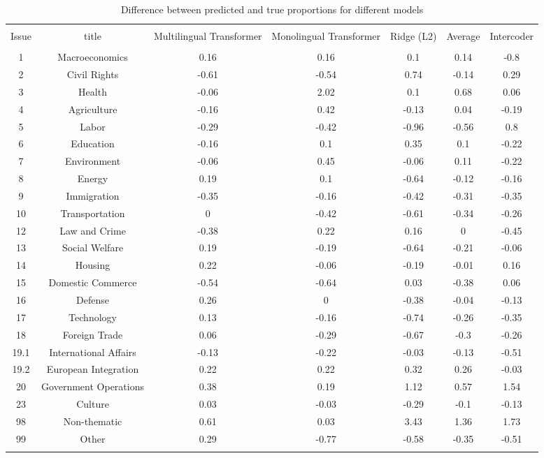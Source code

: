 
\begin{table}[!htbp] \centering 
  \caption{Difference between predicted and true proportions for different models} 
  \label{tab:aggregated-eval} 
\begin{tabular}{@{\extracolsep{5pt}} ccccccc} 
\\[-1.8ex]\hline 
\hline \\[-1.8ex] 
Issue & title & Multilingual Transformer & Monolingual Transformer & Ridge (L2) & Average & Intercoder \\ 
\hline \\[-1.8ex] 
1 & Macroeconomics & 0.16 & 0.16 & 0.1 & 0.14 & -0.8 \\ 
2 & Civil Rights & -0.61 & -0.54 & 0.74 & -0.14 & 0.29 \\ 
3 & Health & -0.06 & 2.02 & 0.1 & 0.68 & 0.06 \\ 
4 & Agriculture & -0.16 & 0.42 & -0.13 & 0.04 & -0.19 \\ 
5 & Labor & -0.29 & -0.42 & -0.96 & -0.56 & 0.8 \\ 
6 & Education & -0.16 & 0.1 & 0.35 & 0.1 & -0.22 \\ 
7 & Environment & -0.06 & 0.45 & -0.06 & 0.11 & -0.22 \\ 
8 & Energy & 0.19 & 0.1 & -0.64 & -0.12 & -0.16 \\ 
9 & Immigration & -0.35 & -0.16 & -0.42 & -0.31 & -0.35 \\ 
10 & Transportation & 0 & -0.42 & -0.61 & -0.34 & -0.26 \\ 
12 & Law and Crime & -0.38 & 0.22 & 0.16 & 0 & -0.45 \\ 
13 & Social Welfare & 0.19 & -0.19 & -0.64 & -0.21 & -0.06 \\ 
14 & Housing & 0.22 & -0.06 & -0.19 & -0.01 & 0.16 \\ 
15 & Domestic Commerce & -0.54 & -0.64 & 0.03 & -0.38 & 0.06 \\ 
16 & Defense & 0.26 & 0 & -0.38 & -0.04 & -0.13 \\ 
17 & Technology & 0.13 & -0.16 & -0.74 & -0.26 & -0.35 \\ 
18 & Foreign Trade & 0.06 & -0.29 & -0.67 & -0.3 & -0.26 \\ 
19.1 & International Affairs & -0.13 & -0.22 & -0.03 & -0.13 & -0.51 \\ 
19.2 & European Integration & 0.22 & 0.22 & 0.32 & 0.26 & -0.03 \\ 
20 & Government Operations & 0.38 & 0.19 & 1.12 & 0.57 & 1.54 \\ 
23 & Culture & 0.03 & -0.03 & -0.29 & -0.1 & -0.13 \\ 
98 & Non-thematic & 0.61 & 0.03 & 3.43 & 1.36 & 1.73 \\ 
99 & Other & 0.29 & -0.77 & -0.58 & -0.35 & -0.51 \\ 
\hline \\[-1.8ex] 
\end{tabular} 
\end{table} 
